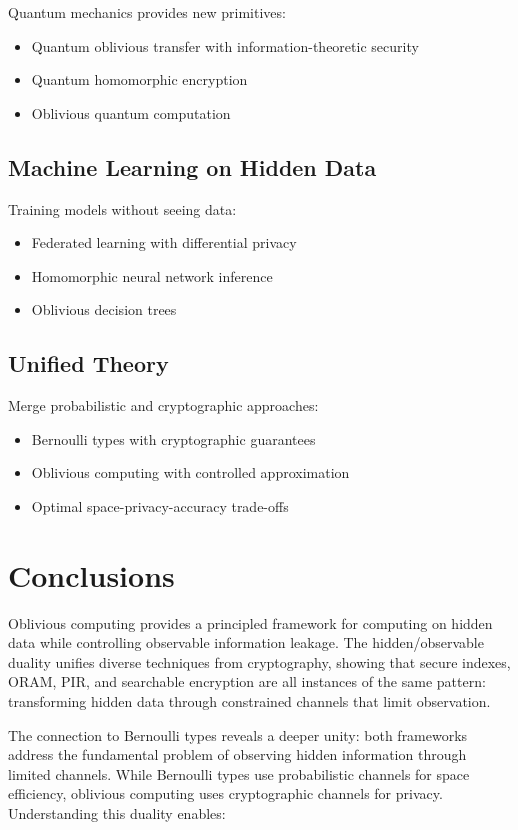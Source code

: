 \documentclass[11pt,final,hidelinks]{article}
\begin{document}
Quantum mechanics provides new primitives:
\begin{itemize}
    \item Quantum oblivious transfer with information-theoretic security
    \item Quantum homomorphic encryption
    \item Oblivious quantum computation
\end{itemize}

\subsection{Machine Learning on Hidden Data}

Training models without seeing data:
\begin{itemize}
    \item Federated learning with differential privacy
    \item Homomorphic neural network inference
    \item Oblivious decision trees
\end{itemize}

\subsection{Unified Theory}

Merge probabilistic and cryptographic approaches:
\begin{itemize}
    \item Bernoulli types with cryptographic guarantees
    \item Oblivious computing with controlled approximation
    \item Optimal space-privacy-accuracy trade-offs
\end{itemize}

\section{Conclusions}

Oblivious computing provides a principled framework for computing on hidden data while controlling observable information leakage. The hidden/observable duality unifies diverse techniques from cryptography, showing that secure indexes, ORAM, PIR, and searchable encryption are all instances of the same pattern: transforming hidden data through constrained channels that limit observation.

The connection to Bernoulli types reveals a deeper unity: both frameworks address the fundamental problem of observing hidden information through limited channels. While Bernoulli types use probabilistic channels for space efficiency, oblivious computing uses cryptographic channels for privacy. Understanding this duality enables:
\end{document}
